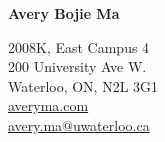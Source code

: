 \documentclass[11pt,letterpaper]{article}
\begin{document}
\raggedright

  {\bfseries\Huge{Avery Bojie Ma}}
  \vspace{10pt}

  {\small
    2008K, East Campus 4 \\
    200 University Ave W.\\
    Waterloo, ON, N2L 3G1\\
    \vspace{-1pt}
    \href{http://averyma.com}{averyma.com}\\
    \vspace{-2pt}
    \href{mailto:avery.ma@uwaterloo.ca}{avery.ma@uwaterloo.ca}
    \vspace{-3pt}
  }
  










% 
\end{document}
